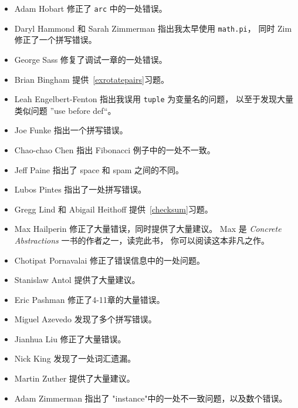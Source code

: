 \documentclass[10pt]{book}
\begin{document}
\begin{itemize}
\item Adam Hobart 修正了 {\tt arc} 中的一处错误。

\item Daryl Hammond 和 Sarah Zimmerman 指出我太早使用 {\tt math.pi}，
 同时 Zim 修正了一个拼写错误。

\item George Sass 修复了调试一章的一处错误。

\item Brian Bingham 提供~\ref{exrotatepairs}习题。

\item Leah Engelbert-Fenton 指出我误用  {\tt tuple} 为变量名的问题，
以至于发现大量类似问题 ”use before def“。

\item Joe Funke 指出一个拼写错误。

\item Chao-chao Chen 指出 Fibonacci 例子中的一处不一致。

\item Jeff Paine 指出了 space 和 spam 之间的不同。

\item Lubos Pintes 指出了一处拼写错误。

\item Gregg Lind 和 Abigail Heithoff 提供~\ref{checksum}习题。

\item Max Hailperin 修正了大量错误，同时提供了大量建议。 
Max 是  {\em  Concrete Abstractions} 一书的作者之一，读完此书，
你可以阅读这本非凡之作。

\item Chotipat Pornavalai 修正了错误信息中的一处问题。

\item Stanislaw Antol 提供了大量建议。

\item Eric Pashman 修正了4-11章的大量错误。


\item Miguel Azevedo 发现了多个拼写错误。

\item Jianhua Liu 修正了大量错误。

\item Nick King 发现了一处词汇遗漏。

\item Martin Zuther 提供了大量建议。

\item Adam Zimmerman 指出了 "instance"中的一处不一致问题，以及数个错误。


\end{itemize}
\end{document}

